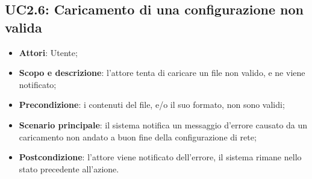 \subsection{UC2.6: Caricamento di una configurazione non valida}
\hypertarget{UC2.6}{}
\begin{itemize}
	\item \textbf{Attori}: Utente;
	\item \textbf{Scopo e descrizione}: l'attore tenta di caricare un file non valido, e ne viene notificato;
	\item \textbf{Precondizione}: i contenuti del file, e/o il suo formato, non sono validi;
	\item \textbf{Scenario principale}: il sistema notifica un messaggio d'errore causato da un caricamento non andato a buon fine della configurazione di rete;
	\item \textbf{Postcondizione}: l'attore viene notificato dell'errore, il sistema rimane nello stato precedente all'azione.
\end{itemize}

